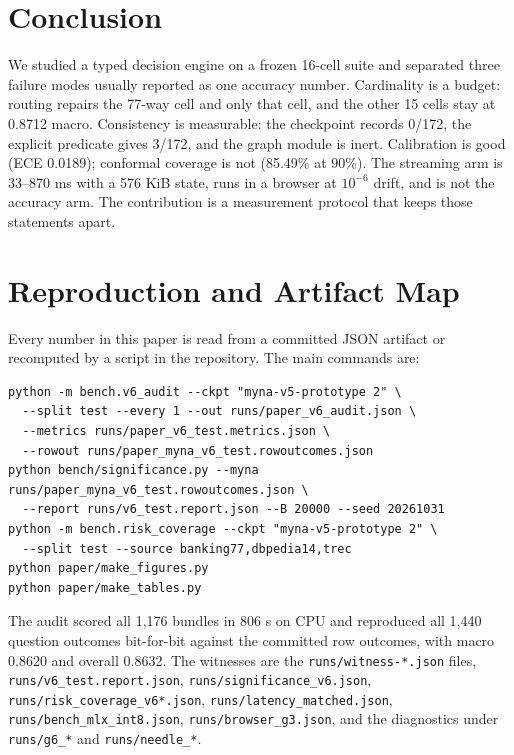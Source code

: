 \section{Conclusion}
\label{sec:conclusion}

We studied a typed decision engine on a frozen 16-cell suite and separated three failure modes usually reported as one accuracy number. Cardinality is a budget: routing repairs the 77-way cell and only that cell, and the other 15 cells stay at 0.8712 macro. Consistency is measurable: the checkpoint records 0/172, the explicit predicate gives 3/172, and the graph module is inert. Calibration is good (ECE 0.0189); conformal coverage is not (85.49\% at 90\%). The streaming arm is 33--870 ms with a 576 KiB state, runs in a browser at $10^{-6}$ drift, and is not the accuracy arm. The contribution is a measurement protocol that keeps those statements apart.

\appendix

\section{Reproduction and Artifact Map}
\label{app:extra}

Every number in this paper is read from a committed JSON artifact or recomputed by a script in the repository. The main commands are:

{\footnotesize
\begin{verbatim}
python -m bench.v6_audit --ckpt "myna-v5-prototype 2" \
  --split test --every 1 --out runs/paper_v6_audit.json \
  --metrics runs/paper_v6_test.metrics.json \
  --rowout runs/paper_myna_v6_test.rowoutcomes.json
python bench/significance.py --myna runs/paper_myna_v6_test.rowoutcomes.json \
  --report runs/v6_test.report.json --B 20000 --seed 20261031
python -m bench.risk_coverage --ckpt "myna-v5-prototype 2" \
  --split test --source banking77,dbpedia14,trec
python paper/make_figures.py
python paper/make_tables.py
\end{verbatim}
}

The audit scored all 1{,}176 bundles in 806 s on CPU and reproduced all 1{,}440 question outcomes bit-for-bit against the committed row outcomes, with macro 0.8620 and overall 0.8632. The witnesses are the \texttt{runs/witness-*.json} files, \texttt{runs/v6\_test.report.json}, \texttt{runs/significance\_v6.json}, \texttt{runs/risk\_coverage\_v6*.json}, \texttt{runs/latency\_matched.json}, \texttt{runs/bench\_mlx\_int8.json}, \texttt{runs/browser\_g3.json}, and the diagnostics under \texttt{runs/g6\_*} and \texttt{runs/needle\_*}.

